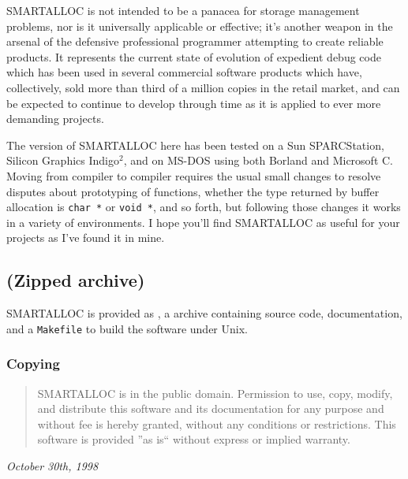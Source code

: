 SMARTALLOC is not intended to be a panacea for storage management problems,
nor is it universally applicable or effective; it's another weapon in the
arsenal of the defensive professional programmer attempting to create reliable
products. It represents the current state of evolution of expedient debug code
which has been used in several commercial software products which have,
collectively, sold more than third of a million copies in the retail market,
and can be expected to continue to develop through time as it is applied to
ever more demanding projects. 

The version of SMARTALLOC here has been tested on a Sun SPARCStation, Silicon
Graphics Indigo$^2$, and on MS-DOS using both Borland and Microsoft C. Moving
from compiler to compiler requires the usual small changes to resolve disputes
about prototyping of functions, whether the type returned by buffer allocation
is {\tt char\ *} or {\tt void\ *}, and so forth, but following those changes
it works in a variety of environments. I hope you'll find SMARTALLOC as useful
for your projects as I've found it in mine. 

\subsection*{
(Zipped archive)}

SMARTALLOC is provided as 
, a  
 archive containing  source code,
documentation, and a  {\tt Makefile} to build the software under Unix. 

\subsubsection*{ Copying}

\begin{quote}
SMARTALLOC is in the public domain. Permission to use, copy, modify, and
distribute this software and its documentation for any purpose and without fee
is hereby granted, without any conditions or restrictions. This software is
provided ''as is`` without express or implied warranty. 
\end{quote}

{\it 
{}
October 30th, 1998 } 
